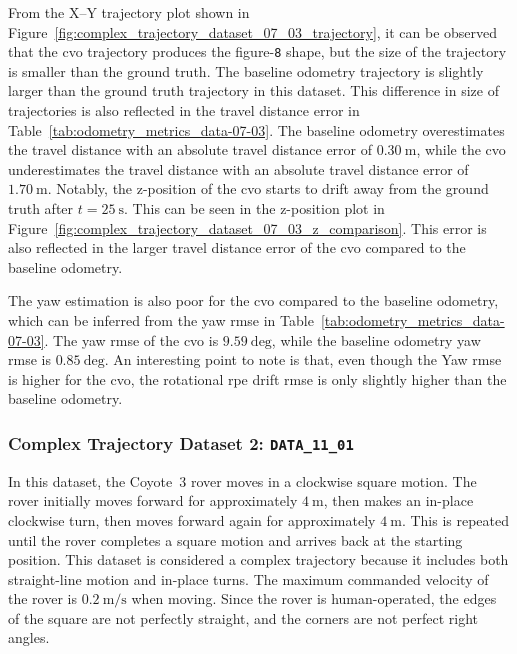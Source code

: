 \documentclass[report.tex]{subfiles}
\begin{document}
    

    From the X--Y trajectory plot shown in Figure~\ref{fig:complex_trajectory_dataset_07_03_trajectory}, it can be observed that the \gls{cvo} trajectory produces the figure-\texttt{8} shape, but the size of the trajectory is smaller than the ground truth. The baseline odometry trajectory is slightly larger than the ground truth trajectory in this dataset. This difference in size of trajectories is also reflected in the travel distance error in Table~\ref{tab:odometry_metrics_data-07-03}. The baseline odometry overestimates the travel distance with an absolute travel distance error of $0.30~\mathrm{m}$, while the \gls{cvo} underestimates the travel distance with an absolute travel distance error of $1.70~\mathrm{m}$. Notably, the z-position of the \gls{cvo} starts to drift away from the ground truth after $t=25~\mathrm{s}$. This can be seen in the z-position plot in Figure~\ref{fig:complex_trajectory_dataset_07_03_z_comparison}. This error is also reflected in the larger travel distance error of the \gls{cvo} compared to the baseline odometry. 
    
    The yaw estimation is also poor for the \gls{cvo} compared to the baseline odometry, which can be inferred from the yaw \gls{rmse} in Table~\ref{tab:odometry_metrics_data-07-03}. The yaw \gls{rmse} of the \gls{cvo} is $9.59~\mathrm{deg}$, while the baseline odometry yaw \gls{rmse} is $0.85~\mathrm{deg}$. An interesting point to note is that, even though the Yaw \gls{rmse} is higher for the \gls{cvo}, the rotational \gls{rpe} drift \gls{rmse} is only slightly higher than the baseline odometry. 

    \FloatBarrier

    \subsubsection{Complex Trajectory Dataset 2: \texttt{DATA\_11\_01}} \label{subsubsec:complexTrajectoryD2_11_01}

    In this dataset, the Coyote~3 rover moves in a clockwise square motion. The rover initially moves forward for approximately $4~\mathrm{m}$, then makes an in-place clockwise turn, then moves forward again for approximately $4~\mathrm{m}$. This is repeated until the rover completes a square motion and arrives back at the starting position. This dataset is considered a complex trajectory because it includes both straight-line motion and in-place turns. The maximum commanded velocity of the rover is $0.2~\mathrm{m/s}$ when moving. Since the rover is human-operated, the edges of the square are not perfectly straight, and the corners are not perfect right angles. 
\end{document}
